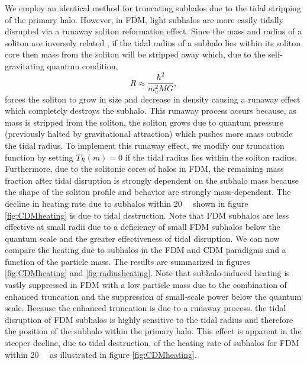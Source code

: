 \documentclass[usenatbib]{mnras}
\begin{document}
We employ an identical method for truncating subhalos due to the tidal stripping of the primary halo. However, in FDM, light subhalos are more easily tidally disrupted via a runaway soliton reformation effect. Since the mass and radius of a soliton are inversely related \citep{solitons}, if the tidal radius of a subhalo lies within its soliton core then mass from the soliton will be stripped away which, due to the self-gravitating quantum condition,
\begin{equation}
R \approx \frac{\hbar^2}{m_a^2 M G},
\end{equation} 
forces the soliton to grow in size and decrease in density causing a runaway effect which completely destroys the subhalo. This runaway process occurs because, as mass is stripped from the soliton, the soliton grows due to quantum pressure (previously halted by gravitational attraction) which pushes more mass outside the tidal radius. To implement this runaway effect, we modify our truncation function by setting $T_R(m) = 0$ if the tidal radius lies within the soliton radius. 
        Furthermore, due to the solitonic cores of halos in FDM, the remaining mass fraction after tidal disruption is strongly dependent on the subhalo mass because the shape of the soliton profile and behavior are strongly mass-dependent. The decline in heating rate due to subhalos within \SI{20}{\kilo\parsec} shown in figure \ref{fig:CDMheating} is due to tidal destruction. Note that FDM subhalos are less effective at small radii due to a deficiency of small FDM subhalos below the quantum scale and the greater effectiveness of tidal disruption. We can now compare the heating due to subhalos in the FDM and CDM paradigms and a function of the particle mass. The results are summarized in figures \ref{fig:CDMheating} and  \ref{fig:radiusheating}. Note that subhalo-induced heating is vastly suppressed in FDM with a low particle mass due to the combination of enhanced truncation and the suppression of small-scale power below the quantum scale. Because the enhanced truncation is due to a runaway process, the tidal disruption of FDM subhalos is highly sensitive to the tidal radius and therefore the position of the subhalo within the primary halo.
This effect is apparent in the steeper decline,  due to tidal destruction, of the heating rate of subhalos for FDM within \SI{20}{\kilo\parsec} as illustrated in figure \ref{fig:CDMheating}.
 
\end{document}

